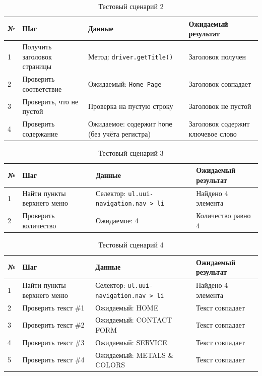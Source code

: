 \documentclass{article}[14pt]
\begin{document}
\begin{table}[H]
\centering
\caption{Тестовый сценарий 2}
\label{tab:test_scenario}
\begin{tabular}{|l|p{3.5cm}|p{4cm}|p{3.5cm}|}
\hline
\textbf{№} & \textbf{Шаг} & \textbf{Данные} & \textbf{Ожидаемый результат} \\
\hline
1 & Получить заголовок страницы & Метод: \texttt{driver.getTitle()} & Заголовок получен \\
\hline
2 & Проверить соответствие & Ожидаемый: \texttt{Home Page} & Заголовок совпадает \\
\hline
3 & Проверить, что не пустой & Проверка на пустую строку & Заголовок не пустой \\
\hline
4 & Проверить содержание & Ожидаемое: содержит \texttt{home} (без учёта регистра) & Заголовок содержит ключевое слово \\
\hline
\end{tabular}
\end{table}

\begin{table}[H]
\centering
\caption{Тестовый сценарий 3}
\begin{tabular}{|l|p{3.5cm}|p{4cm}|p{3.5cm}|}
\hline
\textbf{№} & \textbf{Шаг} & \textbf{Данные} & \textbf{Ожидаемый результат} \\
\hline
1 & Найти пункты верхнего меню & Селектор: \texttt{ul.uui-navigation.nav > li} & Найдено 4 элемента \\
\hline
2 & Проверить количество & Ожидаемое: 4 & Количество равно 4 \\
\hline
\end{tabular}
\end{table}

\begin{table}[H]
\centering
\caption{Тестовый сценарий 4}
\label{tab:test_scenario_4}
\begin{tabular}{|l|p{3.5cm}|p{4.5cm}|p{3.5cm}|}
\hline
\textbf{№} & \textbf{Шаг} & \textbf{Данные} & \textbf{Ожидаемый результат} \\
\hline
1 & Найти пункты верхнего меню & Селектор: \texttt{ul.uui-navigation.nav > li} & Найдено 4 элемента \\
\hline
2 & Проверить текст \#1 & Ожидаемый: HOME & Текст совпадает \\
\hline
3 & Проверить текст \#2 & Ожидаемый: CONTACT FORM & Текст совпадает \\
\hline
4 & Проверить текст \#3 & Ожидаемый: SERVICE & Текст совпадает \\
\hline
5 & Проверить текст \#4 & Ожидаемый: METALS \& COLORS & Текст совпадает \\
\hline
\end{tabular}
\end{table}
\end{document}
